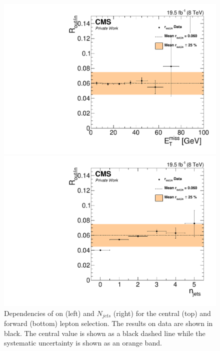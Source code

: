 \begin{figure}[htbp]
\begin{minipage}[t]{0.49\textwidth}
  \includegraphics[width=\textwidth]{plots/BG/rOutIn/rOutInSyst_DrellYanControlForward_Full2012_MET_LowMass_SF_None.pdf}
\end{minipage}
\begin{minipage}[t]{0.49\textwidth}
\includegraphics[width=\textwidth]{plots/BG/rOutIn/rOutInSyst_DrellYanControlForward_Full2012_NJets_LowMass_SF_None.pdf}
\end{minipage}
\caption{Dependencies of \Routin on \MET (left) and $N_{jets}$ (right) for the central (top) and forward (bottom) lepton selection. The results on data are shown in black. The central value is shown as a black dashed line while the systematic uncertainty is shown as an orange band.}
\label{fig:ROutInDependencies}
\end{figure} 


